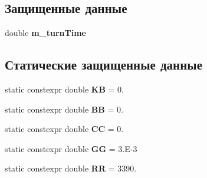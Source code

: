 \subsection*{Защищенные данные}
\begin{DoxyCompactItemize}
\item 
double {\bfseries m\+\_\+turn\+Time}\hypertarget{class_tasks_1_1_continuous_1_1_landing_linear_a79bc6b7e7f836080684aa36e4f6cec5f}{}\label{class_tasks_1_1_continuous_1_1_landing_linear_a79bc6b7e7f836080684aa36e4f6cec5f}

\end{DoxyCompactItemize}
\subsection*{Статические защищенные данные}
\begin{DoxyCompactItemize}
\item 
static constexpr double {\bfseries KB} = 0.\hypertarget{class_tasks_1_1_continuous_1_1_landing_linear_a429e2f85bd502a35b59f84021f63e456}{}\label{class_tasks_1_1_continuous_1_1_landing_linear_a429e2f85bd502a35b59f84021f63e456}

\item 
static constexpr double {\bfseries BB} = 0.\hypertarget{class_tasks_1_1_continuous_1_1_landing_linear_a9327ad0f9f6f06ce3278722f42d4cc42}{}\label{class_tasks_1_1_continuous_1_1_landing_linear_a9327ad0f9f6f06ce3278722f42d4cc42}

\item 
static constexpr double {\bfseries CC} = 0.\hypertarget{class_tasks_1_1_continuous_1_1_landing_linear_ab539ba664a08722ed6c9a855be340567}{}\label{class_tasks_1_1_continuous_1_1_landing_linear_ab539ba664a08722ed6c9a855be340567}

\item 
static constexpr double {\bfseries GG} = 3.\+E-\/3\hypertarget{class_tasks_1_1_continuous_1_1_landing_linear_a9a79b7472c9e491554ca0f76b76106e0}{}\label{class_tasks_1_1_continuous_1_1_landing_linear_a9a79b7472c9e491554ca0f76b76106e0}

\item 
static constexpr double {\bfseries RR} = 3390.\hypertarget{class_tasks_1_1_continuous_1_1_landing_linear_ae35b8a06f6479415f11e967602fbf0d6}{}\label{class_tasks_1_1_continuous_1_1_landing_linear_ae35b8a06f6479415f11e967602fbf0d6}

\end{DoxyCompactItemize}



